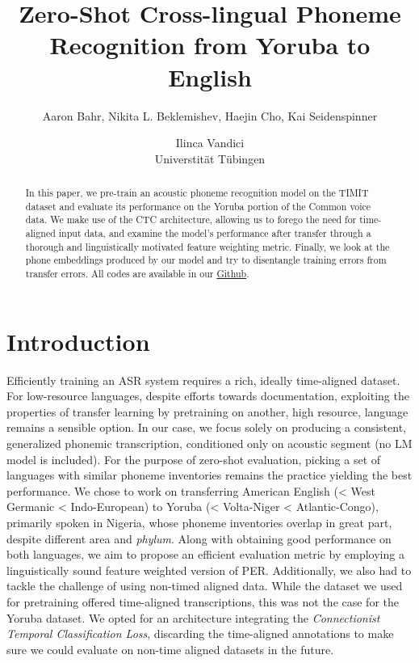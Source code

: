 \documentclass[11pt]{article}
\title{Zero-Shot Cross-lingual Phoneme Recognition from Yoruba to English}
\author{Aaron Bahr, Nikita L. Beklemishev, Haejin Cho, Kai Seidenspinner \and Ilinca Vandici \\
         Universtität Tübingen }
\begin{document}
\maketitle
\outauthor
\begin{abstract}
In this paper, we pre-train an acoustic phoneme recognition model on the TIMIT dataset and evaluate its performance on the Yoruba portion of the Common voice data. We make use of the CTC architecture, allowing us to forego the need for time-aligned input data, and examine the model’s performance after transfer through a thorough and linguistically motivated feature weighting metric. Finally, we look at the phone embeddings produced by our model and try to disentangle training errors from transfer errors. All codes are available in our \href{https://github.com/lilovyjgrib/X-lingual_IPA_ASR}{Github}.
\end{abstract}

\section{Introduction}
Efficiently training an ASR system requires a rich, ideally time-aligned dataset. For low-resource languages, despite efforts towards documentation, exploiting the properties of transfer learning by pretraining on another, high resource, language remains a sensible option. In our case, we focus solely on producing a consistent, generalized phonemic transcription, conditioned only on acoustic segment (no LM model is included). For the purpose of zero-shot evaluation, picking a set of languages with similar phoneme inventories remains the practice yielding the best performance. We chose to work on transferring American English (< West Germanic < Indo-European) to Yoruba (< Volta-Niger < Atlantic-Congo), primarily spoken in Nigeria, whose phoneme inventories overlap in great part, despite different area and \textit{phylum}. 
Along with obtaining good performance on both languages, we aim to propose an efficient evaluation metric by employing a linguistically sound feature weighted version of PER. 
Additionally, we also had to tackle the challenge of using non-timed aligned data. While the dataset we used for pretraining offered time-aligned transcriptions, this was not the case for the Yoruba dataset. We opted for an architecture integrating the \textit{Connectionist Temporal Classification Loss}, discarding the time-aligned annotations to make sure we could evaluate on non-time aligned datasets in the future.  
\end{document}
